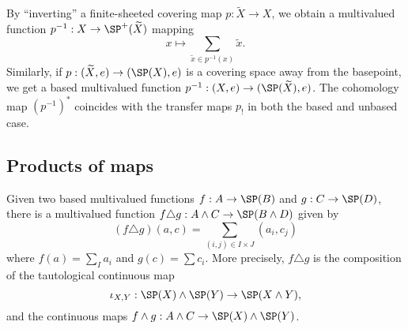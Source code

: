 \begin{example}\label{rem:coveringsandtransfers}
By ``inverting'' a finite-sheeted covering map $p:\widetilde{X}\to X$, we obtain a multivalued function $p^{-1}:X\to \SP^+(\widetilde{X})$ mapping
$${x}\longmapsto \sum_{\widetilde{x}\in p^{-1}({x})}\widetilde{x}.$$
Similarly, if $p:(\widetilde{X},e)\to (\SP(X),e)$ is a covering space away from the basepoint, we get a based multivalued function $p^{-1}:(X,e)\to (\SP(\widetilde{X}),e)$. The cohomology map $(p^{-1})^*$ coincides with the transfer maps $p_!$ in both the based and unbased case.
\end{example}

\subsection{Products of maps}
Given two based multivalued functions $f:A\to \SP(B)$ and $g:C\to \SP(D)$, there is a multivalued function $f\triangle g:A\wedge C\to \SP(B\wedge D)$ given by
$$(f\triangle g)(a,c)=\sum_{(i,j)\in I\times J} (a_i,c_j)$$
where $f(a)=\sum_I a_i$ and $g(c)=\sum c_i$. 
More precisely, $f\triangle g$ is the composition of the tautological continuous map \begin{equation*}
\iota_{X,Y}:\SP(X)\wedge \SP(Y)\to \SP(X\wedge Y),
\end{equation*}
and  
the continuous maps $f\wedge g:A\wedge C\to \SP(X)\wedge \SP(Y)$.

